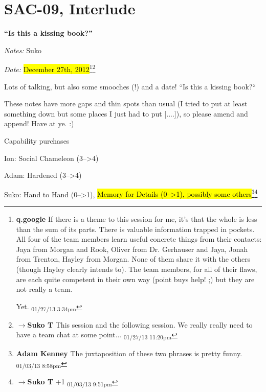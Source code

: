 \setcounter{chapter}{ 12 }
\chapter{\textbf{SAC-09, Interlude} }




\begin{center}
 {\LARGE \textbf{``Is this a kissing book?''} } 
\end{center}




\textit{Notes:} Suko

\textit{Date:} \hl{December 27th, 2012}\footnote{\textbf{q.google }If there is a theme to this session for me, it's that the whole is less than the sum of its parts.  There is valuable information trapped in pockets.  All four of the team members learn useful concrete things from their contacts: Jaya from Morgan and Rook, Oliver from Dr. Gerhauser and Jaya, Jonah from Trenton, Hayley from Morgan.  None of them share it with the others (though Hayley clearly intends to).  The team members, for all of their flaws, are each quite competent in their own way (point buys help! ;) but they are not really a team.

Yet. \textsubscript{01/27/13 3:34pm}}\footnote{$\rightarrow$\textbf{Suko T }This session and the following session.  We really really need to have a team chat at some point... \textsubscript{01/27/13 11:20pm}}



Lots of talking, but also some smooches (!) and a date!  ``Is this a kissing book?``



These notes have more gaps and thin spots than usual (I tried to put at least something down but some places I just had to put {[}....{]}), so please amend and append!  Have at ye. :)



\noindent\hrulefill



 {\LARGE Capability purchases } 

Ion: Social Chameleon (3--\textgreater 4)

Adam: Hardened (3--\textgreater 4)

Suko: Hand to Hand (0--\textgreater 1), \hl{Memory for Details (0--\textgreater 1), possibly some others}\footnote{\textbf{Adam Kenney }The juxtaposition of these two phrases is pretty funny. \textsubscript{01/03/13 8:58pm}}\footnote{$\rightarrow$\textbf{Suko T }+1 \textsubscript{01/03/13 9:51pm}}



